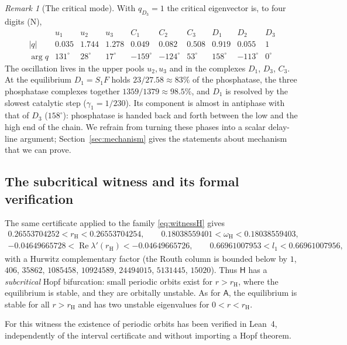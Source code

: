 \documentclass[11pt,a4paper]{article}
\theoremstyle{plain}
\theoremstyle{definition}
\theoremstyle{remark}
\newtheorem{remark}[theorem]{Remark}
\newcommand{\rH}{r_{\mathrm H}}
\newcommand{\omH}{\omega_{\mathrm H}}
\newcommand{\WA}{\mathsf A}
\newcommand{\WH}{\mathsf H}
\DeclareMathOperator{\Ree}{Re}
\newcommand{\evN}{\textsf{N}}
\begin{document}
\begin{remark}[The critical mode]\label{rem:mode}
With $q_{D_3}=1$ the critical eigenvector is, to four digits (\evN),
\[
\begin{array}{c|ccccccccc}
 & u_1&u_2&u_3&C_1&C_2&C_3&D_1&D_2&D_3\\\hline
|q| & 0.035&1.744&1.278&0.049&0.082&0.508&0.919&0.055&1\\
\arg q & 131^\circ&28^\circ&17^\circ&-159^\circ&-124^\circ&53^\circ&158^\circ&-113^\circ&0^\circ
\end{array}
\]
The oscillation lives in the upper pools $u_2,u_3$ and in the complexes $D_1$, $D_3$, $C_3$. At the equilibrium $D_1=S_1F$ holds $23/27.58\approx83\%$ of the phosphatase, the three phosphatase complexes together $1359/1379\approx98.5\%$, and $D_1$ is resolved by the slowest catalytic step ($\gamma_1=1/230$). Its component is almost in antiphase with that of $D_3$ ($158^\circ$): phosphatase is handed back and forth between the low and the high end of the chain. We refrain from turning these phases into a scalar delay-line argument; Section~\ref{sec:mechanism} gives the statements about mechanism that we can prove.
\end{remark}

\subsection{The subcritical witness and its formal verification}\label{sec:lean}
The same certificate applied to the family \eqref{eq:witnessH} gives
\begin{equation}\label{eq:Hdata}
\begin{gathered}
 0.26553704252<\rH<0.26553704254,\qquad 0.18038559401<\omH<0.18038559403,\\
 -0.04649665728<\Ree\lambda'(\rH)<-0.04649665726,\qquad 0.66961007953<l_1<0.66961007956,
\end{gathered}
\end{equation}
with a Hurwitz complementary factor (the Routh column is bounded below by $1$, $406$, $35862$, $1085458$, $10924589$, $24494015$, $5131445$, $15020$). Thus $\WH$ has a \emph{subcritical} Hopf bifurcation: small periodic orbits exist for $r>\rH$, where the equilibrium is stable, and they are orbitally unstable. As for $\WA$, the equilibrium is stable for all $r>\rH$ and has two unstable eigenvalues for $0<r<\rH$.

For this witness the existence of periodic orbits has been verified in Lean~4, independently of the interval certificate and without importing a Hopf theorem.
\end{document}
